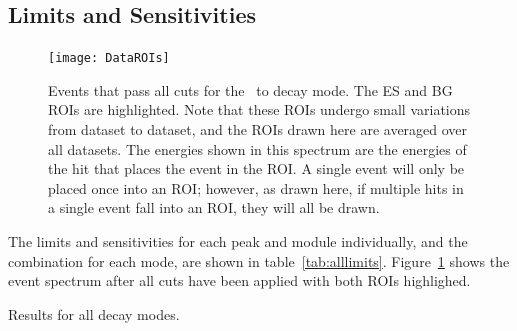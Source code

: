 \documentclass[/main.tex]{subfiles}
\begin{document}
\subsection{Limits and Sensitivities}
\begin{figure}[h]
  \centering
  \texttt{[image: DataROIs]}
  \caption[Measured events after all cuts with ROIs drawn]{\label{fig:roievents}
    Events that pass all cuts for the \tnbb\ to  decay mode. The ES and BG ROIs are highlighted. Note that these ROIs undergo small variations from dataset to dataset, and the ROIs drawn here are averaged over all datasets. The energies shown in this spectrum are the energies of the hit that places the event in the ROI. A single event will only be placed once into an ROI; however, as drawn here, if multiple hits in a single event fall into an ROI, they will all be drawn.
  }
\end{figure}
The limits and sensitivities for each peak and module individually, and the combination for each mode, are shown in table~\ref{tab:alllimits}.
Figure~\ref{fig:roievents} shows the event spectrum after all cuts have been applied with both ROIs highlighed.

\begin{table}[h]
  \footnotesize
  \centering
  
  \caption[Final results for all decay modes]{ \label{tab:alllimits}
    Results for all decay modes.
  }
\end{table}
\end{document}
